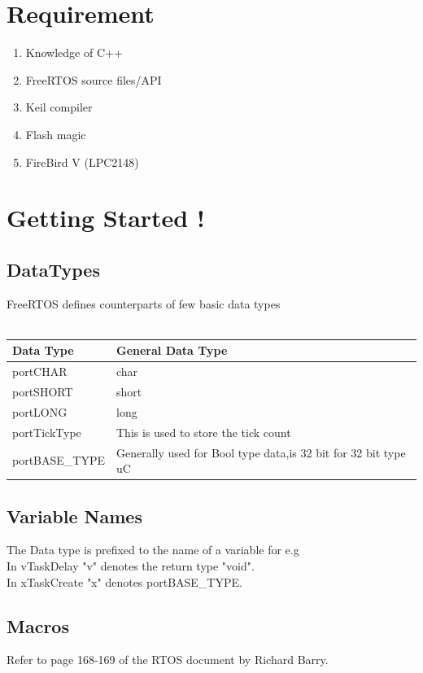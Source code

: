 \documentclass[11pt,a4paper]{article}
\begin{document}
\section{Requirement}
\begin{enumerate}
	\item Knowledge of C++ 
	\item FreeRTOS source files/API
	\item Keil compiler
	\item Flash magic
	\item FireBird V (LPC2148)
\end{enumerate}


\section{Getting Started !}

	\subsection{DataTypes}
		FreeRTOS defines counterparts of few basic data types
		\\
		\\
\begin{tabular}{|l|l|}
	\hline
	\textbf{Data Type }&\textbf{General Data Type}\\
	 \hline
	 	portCHAR&char\\ \hline
		portSHORT&short\\ \hline
		portLONG&long\\ \hline
		portTickType&This is used to store the tick count\\ \hline
		portBASE\_TYPE&Generally used for Bool type data,is 32 bit for 32 bit type uC\\ \hline
\end{tabular}

	\subsection{Variable Names}
	The Data type is prefixed to the name of a variable for e.g \\
	
	In vTaskDelay "v" denotes the return type "void".\\
	
	In xTaskCreate "x" denotes portBASE\_TYPE.
	
	\subsection{Macros}
	Refer to page 168-169 of the RTOS document by Richard Barry.
	
\end{document}
